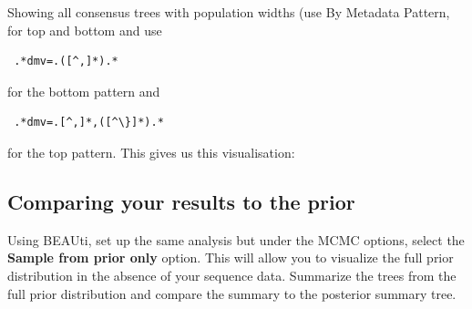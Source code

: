 \documentclass{article}
\begin{document}
Showing all consensus trees with population widths
(use By Metadata Pattern, for top and bottom and use {\begin{verbatim} .*dmv=.([^,]*).*\end{verbatim}} 
for the bottom pattern and {\begin{verbatim} .*dmv=.[^,]*,([^\}]*).*\end{verbatim}} for the top pattern.
This gives us this visualisation:

\begin{center}
\end{center}




\subsection*{Comparing your results to the prior}

Using BEAUti, set up the same analysis but under the MCMC options, select the {\bf Sample from prior only} option. This will allow you to visualize the full prior distribution in the absence of your sequence data. Summarize the trees from the full prior
distribution and compare the summary to the posterior summary tree.




\end{document}
